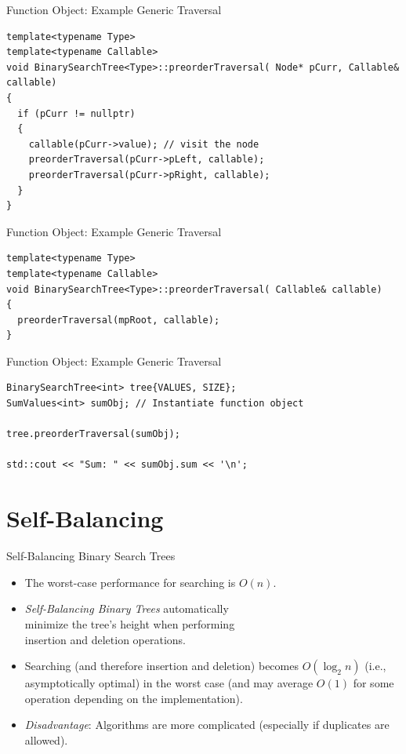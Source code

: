 \documentclass[14pt,aspectratio=1610]{beamer}
\begin{document}
\begin{frame}[fragile]{Function Object: Example Generic Traversal}
\begin{lstlisting}[basicstyle=\ttfamily\small]
template<typename Type>
template<typename Callable>
void BinarySearchTree<Type>::preorderTraversal( Node* pCurr, Callable& callable)
{
  if (pCurr != nullptr)
  {
    callable(pCurr->value); // visit the node
    preorderTraversal(pCurr->pLeft, callable);
    preorderTraversal(pCurr->pRight, callable);
  }
}
\end{lstlisting}
\end{frame}

\begin{frame}[fragile]{Function Object: Example Generic Traversal}
\begin{lstlisting}[basicstyle=\ttfamily\small]
template<typename Type>
template<typename Callable>
void BinarySearchTree<Type>::preorderTraversal( Callable& callable)
{
  preorderTraversal(mpRoot, callable);
}
\end{lstlisting}
\end{frame}

\begin{frame}[fragile]{Function Object: Example Generic Traversal}
\begin{lstlisting}[basicstyle=\ttfamily\small]
BinarySearchTree<int> tree{VALUES, SIZE};
SumValues<int> sumObj; // Instantiate function object

tree.preorderTraversal(sumObj);

std::cout << "Sum: " << sumObj.sum << '\n';
\end{lstlisting}
\end{frame}

\section{Self-Balancing}
\begin{frame}{Self-Balancing Binary Search Trees}
\begin{itemize}[<+->]
  \item
    The worst-case performance for searching is \(O(n)\).
  \item
    \emph{Self-Balancing Binary Trees} automatically \\
    minimize the tree's height when performing\\
    insertion and deletion operations.
  \item
    Searching (and therefore insertion and deletion) becomes \(O(\log_2{n})\) (i.e., asymptotically optimal) in the worst case (and may average \(O(1)\) for some operation depending on the implementation).
  \item
    \emph{Disadvantage}: Algorithms are more complicated (especially if duplicates are allowed).
\end{itemize}
\end{frame}
\end{document}
